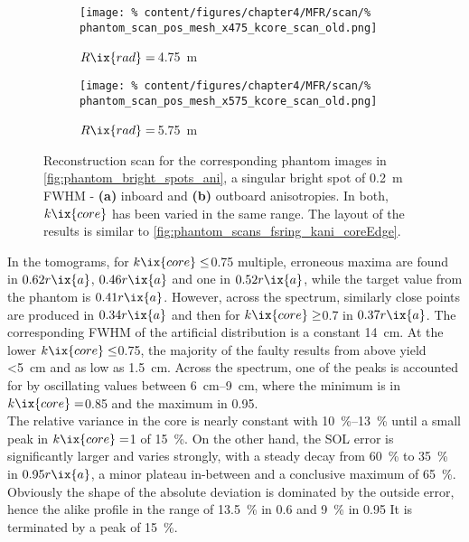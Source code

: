                 \begin{figure}%
                    \centering%
                    \begin{subfigure}{0.45\textwidth}%
                        \centering%
                        \texttt{[image: \%
                            content/figures/chapter4/MFR/scan/\%
                            phantom\_scan\_pos\_mesh\_x475\_kcore\_scan\_old.png]}%
                        \caption{%
                            $R\ix{rad}=\,$\SI{4.75}{\meter}}%
                    \end{subfigure}%
                    \hfill%
                    \begin{subfigure}{0.45\textwidth}%
                        \centering%
                        \texttt{[image: \%
                            content/figures/chapter4/MFR/scan/\%
                            phantom\_scan\_pos\_mesh\_x575\_kcore\_scan\_old.png]}%
                        \caption{%
                            $R\ix{rad}=\,$\SI{5.75}{\meter}}%
                    \end{subfigure}%
                    \caption{Reconstruction scan for the corresponding phantom images in \cref{fig:phantom_bright_spots_ani}, a singular bright spot of \SI{0.2}{\meter} FWHM -  \textbf{(a)} inboard and \textbf{(b)} outboard anisotropies. In both, $k\ix{core}$ has been varied in the same range. The layout of the results is similar to \cref{fig:phantom_scans_fsring_kani_coreEdge}.}\label{fig:phantom_scans_xx75_kani_core}%
                \end{figure}%
%
                In the tomograms, for $k\ix{core}\le$\SI{0.75}{\arbitraryunit} multiple, erroneous maxima are found in $0.62r\ix{a}$, $0.46r\ix{a}$ and one in $0.52r\ix{a}$, while the target value from the phantom is $0.41r\ix{a}$. However, across the spectrum, similarly close points are produced in $0.34r\ix{a}$ and then for $k\ix{core}\ge$\SI{0.7}{\arbitraryunit} in $0.37r\ix{a}$. The corresponding FWHM of the artificial distribution is a constant \SI{14}{\centi\meter}. At the lower $k\ix{core}\le$\SI{0.75}{\arbitraryunit}, the majority of the faulty results from above yield <\SI{5}{\centi\meter} and as low as \SI{1.5}{\centi\meter}. Across the spectrum, one of the peaks is accounted for by oscillating values between \SIrange{6}{9}{\centi\meter}, where the minimum is in $k\ix{core}=$\SI{0.85}{\arbitraryunit} and the maximum in \SI{0.95}{\arbitraryunit}.\\%
                The relative variance in the core is nearly constant with \SIrange{10}{13}{\percent} until a small peak in $k\ix{core}=$\SI{1}{\arbitraryunit} of \SI{15}{\percent}. On the other hand, the SOL error is significantly larger and varies strongly, with a steady decay from \SI{60}{\percent} to \SI{35}{\percent} in $0.95r\ix{a}$, a minor plateau in-between and a conclusive maximum of \SI{65}{\percent}. Obviously the shape of the absolute deviation is dominated by the outside error, hence the alike profile in the range of \SI{13.5}{\percent} in \SI{0.6}{\arbitraryunit} and \SI{9}{\percent} in \SI{0.95}{\arbitraryunit} It is terminated by a peak of \SI{15}{\percent}.\\%
